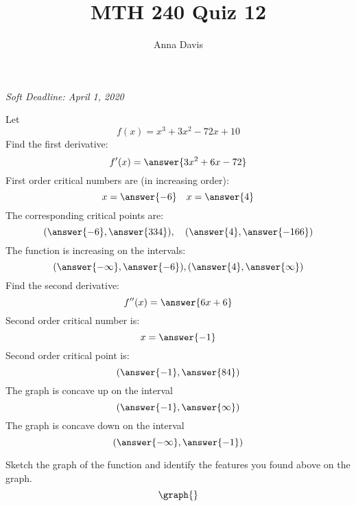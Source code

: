 \documentclass{ximera}
\author{Anna Davis} \title{MTH 240 Quiz 12}
\begin{document}
\begin{abstract}

\end{abstract}
\maketitle
 \textit{Soft Deadline: April 1, 2020}
\begin{problem}\label{prob:240quiz12prob1}
Let $$f(x)=x^3+3x^2-72x+10$$
Find the first derivative:
$$f'(x)=\answer{3x^2+6x-72}$$
First order critical numbers are (in increasing order):
$$x=\answer{-6}\quad x=\answer{4}$$
The corresponding critical points are:
$$(\answer{-6}, \answer{334}),\quad (\answer{4}, \answer{-166})$$
The function is increasing on the intervals:
$$(\answer{-\infty},\answer{-6}), (\answer{4}, \answer{\infty})$$
Find the second derivative:
$$f''(x)=\answer{6x+6}$$
Second order critical number is:
$$x=\answer{-1}$$
Second order critical point is:
$$(\answer{-1}, \answer{84})$$
The graph is concave up on the interval
$$(\answer{-1}, \answer{\infty})$$
The graph is concave down on the interval
$$(\answer{-\infty}, \answer{-1})$$

Sketch the graph of the function and identify the features you found above on the graph.
\[
\graph{}
\]


\end{problem}
\end{document}
